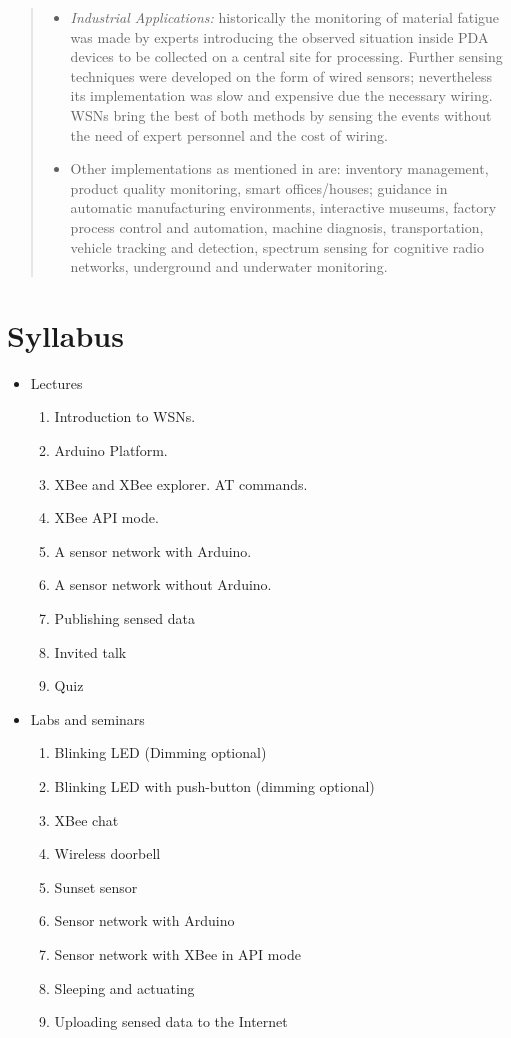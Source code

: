 \begin{quotation}
\begin{itemize}
    \item \emph{Industrial Applications:} historically the monitoring of material fatigue was made by experts introducing the observed situation inside PDA devices to be collected on a central site for processing. Further sensing techniques were developed on the form of wired sensors; nevertheless its implementation was slow and expensive due the necessary wiring. WSNs bring the best of both methods by sensing the events without the need of expert personnel and the cost of wiring. \\
    \item Other implementations as mentioned in \cite{akyildiz2010wireless} are: inventory management, product quality monitoring, smart offices/houses; guidance in automatic manufacturing environments, interactive museums, factory process control and automation, machine diagnosis, transportation, vehicle tracking and detection, spectrum sensing for cognitive radio networks, underground and underwater monitoring. \\
\end{itemize}

\end{quotation}

\section{Syllabus}
\begin{itemize}
  \item Lectures
  \begin{enumerate}
    \item Introduction to WSNs.
    \item Arduino Platform.
    \item XBee and XBee explorer. AT commands.
    \item XBee API mode.
    \item A sensor network with Arduino.
    \item A sensor network without Arduino.
    \item Publishing sensed data
    \item Invited talk
    \item Quiz
  \end{enumerate}
  \item Labs and seminars
  \begin{enumerate}
    \item Blinking LED (Dimming optional)
    \item Blinking LED with push-button (dimming optional)
    \item XBee chat
    \item Wireless doorbell
    \item Sunset sensor
    \item Sensor network with Arduino
    \item Sensor network with XBee in API mode
    \item Sleeping and actuating
    \item Uploading sensed data to the Internet
  \end{enumerate}
\end{itemize}

